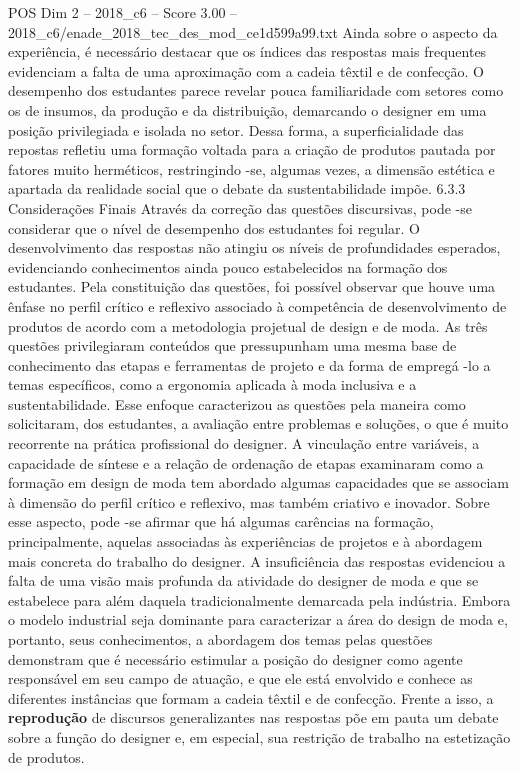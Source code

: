 \begin{textsample}{POS Dim 2 – 2018\_c6 – Score 3.00 – 2018\_c6/enade\_2018\_tec\_des\_mod\_ce1d599a99.txt}
Ainda sobre o aspecto da experiência, é necessário destacar que os índices das respostas mais frequentes evidenciam a falta de uma aproximação com a cadeia têxtil e de confecção.
O desempenho dos estudantes parece revelar pouca familiaridade com setores como os de insumos, da produção e da distribuição, demarcando o designer em uma posição privilegiada e isolada no setor.
Dessa forma, a superficialidade das repostas refletiu uma formação voltada para a criação de produtos pautada por fatores muito herméticos, restringindo -se, algumas vezes, a dimensão estética e apartada da realidade social que o debate da sustentabilidade impõe. 6.3.3 Considerações Finais Através da correção das questões discursivas, pode -se considerar que o nível de desempenho dos estudantes foi regular.
O desenvolvimento das respostas não atingiu os níveis de profundidades esperados, evidenciando conhecimentos ainda pouco estabelecidos na formação dos estudantes.
Pela constituição das questões, foi possível observar que houve uma ênfase no perfil crítico e reflexivo associado à competência de desenvolvimento de produtos de acordo com a metodologia projetual de design e de moda.
As três questões privilegiaram conteúdos que pressupunham uma mesma base de conhecimento das etapas e ferramentas de projeto e da forma de empregá -lo a temas específicos, como a ergonomia aplicada à moda inclusiva e a sustentabilidade.
Esse enfoque caracterizou as questões pela maneira como solicitaram, dos estudantes, a avaliação entre problemas e soluções, o que é muito recorrente na prática profissional do designer.
A vinculação entre variáveis, a capacidade de síntese e a relação de ordenação de etapas examinaram como a formação em design de moda tem abordado algumas capacidades que se associam à dimensão do perfil crítico e reflexivo, mas também criativo e inovador.
Sobre esse aspecto, pode -se afirmar que há algumas carências na formação, principalmente, aquelas associadas às experiências de projetos e à abordagem mais concreta do trabalho do designer.
A insuficiência das respostas evidenciou a falta de uma visão mais profunda da atividade do designer de moda e que se estabelece para além daquela tradicionalmente demarcada pela indústria.
Embora o modelo industrial seja dominante para caracterizar a área do design de moda e, portanto, seus conhecimentos, a abordagem dos temas pelas questões demonstram que é necessário estimular a posição do designer como agente responsável em seu campo de atuação, e que ele está envolvido e conhece as diferentes instâncias que formam a cadeia têxtil e de confecção.
Frente a isso, a \textbf{reprodução} de discursos generalizantes nas respostas põe em pauta um debate sobre a função do designer e, em especial, sua restrição de trabalho na estetização de produtos.

\end{textsample}
